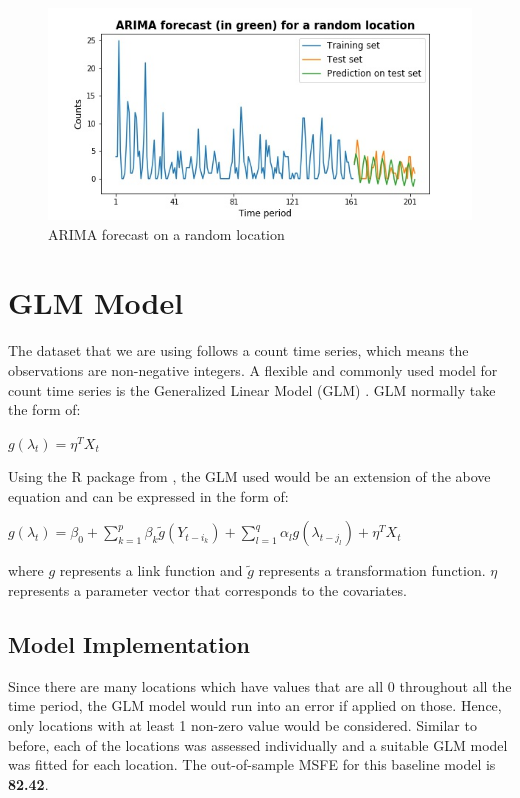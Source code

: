 \documentclass[12pt, letterpaper] {article}
\begin{document}
\begin{figure}[H]
    \centering
    \includegraphics[width=\textwidth]{Images/forecast_example.jpg}
    \caption{ARIMA forecast on a random location}
    \label{fig:ARIMA forecast on a random location}
\end{figure}


\section{GLM Model}
The dataset that we are using follows a count time series, which means the observations are non-negative integers. A flexible and commonly used model for count time series is the Generalized Linear Model (GLM) \cite{Nelder1972}. GLM normally take the form of:

\begin{center}
    $\displaystyle g(\lambda_t)= \eta^T X_t$
\end{center}

\noindent Using the R package from \cite{Tobias2017}, the GLM used would be an extension of the above equation and can be expressed in the form of:

\begin{center}
    $\displaystyle g(\lambda_t)=\beta_0 + \sum_{k=1}^{p}\beta_k\tilde{g}(Y_{t-i_k}) + \sum_{\mathit{l}=1}^{q}\alpha_\mathit{l} g(\lambda_{t-j_\mathit{l}}) + \eta^T X_t$
\end{center}

\noindent where $g$ represents a link function and $ \tilde{g}$ represents a transformation function. $\eta$ represents a parameter vector that corresponds to the covariates. 

\subsection{Model Implementation}
\noindent Since there are many locations which have values that are all 0 throughout all the time period, the GLM model would run into an error if applied on those. Hence, only locations with at least 1 non-zero value would be considered. Similar to before, each of the locations was assessed individually and a suitable GLM model was fitted for each location. The out-of-sample MSFE for this baseline model is \textbf{82.42}. 
\end{document}
